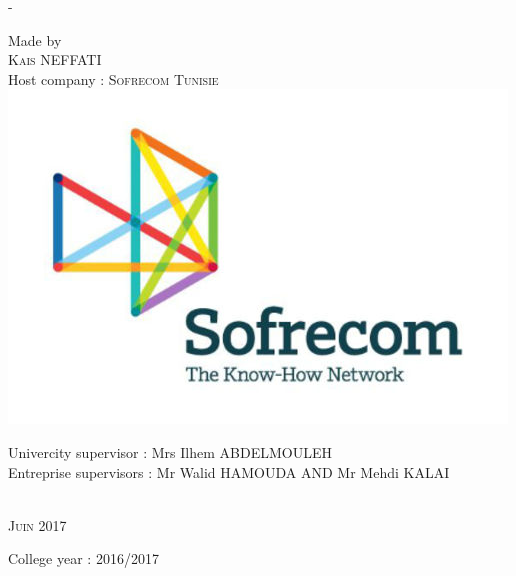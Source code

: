 \begin{titlingpage}
\begin{SingleSpace}
\begin{adjustwidth*}{\unitlength}{-\unitlength}
\begin{center}
\vspace{6.5mm}
{\normalsize Made by}\\
\vspace{5mm}
{\large\textsc{Kais NEFFATI}}\\
\vspace{10mm}
{\large Host company : \textsc{Sofrecom Tunisie}}\\
\vspace{5mm}
\includegraphics[scale=0.2]{logos/logo-sofrecom}\\
\vspace{10mm}
\begin{minipage}{15cm}
\begin{center}
{\small Univercity supervisor : Mrs Ilhem ABDELMOULEH  }\\
\vspace{3mm}
{\small Entreprise supervisors : Mr Walid HAMOUDA AND Mr Mehdi KALAI }\\
\end{center}
\end{minipage}\\
\vspace{8mm}
{\large\textsc{Juin 2017}}\\
\vspace{8mm}
\end{center}
\begin{flushright}
{\small College year : 2016/2017}
\end{flushright}
\end{adjustwidth*}
\end{SingleSpace}
\end{titlingpage}